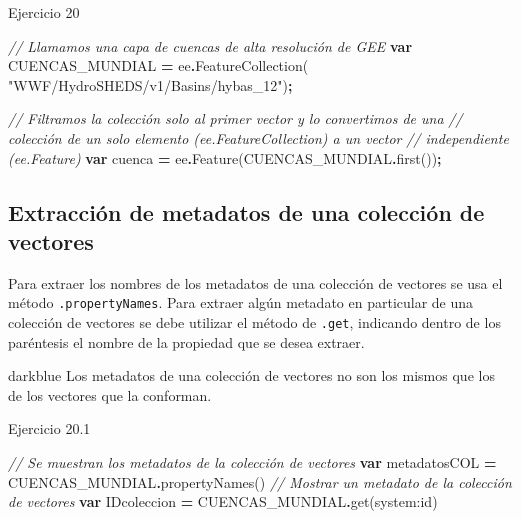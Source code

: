 \documentclass[
  12pt,
  letterpaper,
  twoside]{book}
\newenvironment{Shaded}{\begin{snugshade}}{\end{snugshade}}
\newcommand{\CommentTok}[1]{\textcolor[rgb]{0.56,0.35,0.01}{\textit{#1}}}
\newcommand{\FunctionTok}[1]{\textcolor[rgb]{0.00,0.00,0.00}{#1}}
\newcommand{\KeywordTok}[1]{\textcolor[rgb]{0.13,0.29,0.53}{\textbf{#1}}}
\newcommand{\NormalTok}[1]{#1}
\newcommand{\OperatorTok}[1]{\textcolor[rgb]{0.81,0.36,0.00}{\textbf{#1}}}
\newcommand{\StringTok}[1]{\textcolor[rgb]{0.31,0.60,0.02}{#1}}
\begin{document}
Ejercicio 20

\begin{Shaded}
\begin{Highlighting}[]
\CommentTok{// Llamamos una capa de cuencas de alta resolución de GEE}
\KeywordTok{var}\NormalTok{ CUENCAS\_MUNDIAL }\OperatorTok{=}\NormalTok{ ee}\OperatorTok{.}\FunctionTok{FeatureCollection}\NormalTok{(}
  \StringTok{"WWF/HydroSHEDS/v1/Basins/hybas\_12"}\NormalTok{)}\OperatorTok{;}
 
\CommentTok{// Filtramos la colección solo al primer vector y lo convertimos de una}
\CommentTok{// colección de un solo elemento (ee.FeatureCollection) a un vector }
\CommentTok{// independiente (ee.Feature)}
\KeywordTok{var}\NormalTok{ cuenca }\OperatorTok{=}\NormalTok{ ee}\OperatorTok{.}\FunctionTok{Feature}\NormalTok{(CUENCAS\_MUNDIAL}\OperatorTok{.}\FunctionTok{first}\NormalTok{())}\OperatorTok{;} 
\end{Highlighting}
\end{Shaded}

\hypertarget{extracciuxf3n-de-metadatos-de-una-colecciuxf3n-de-vectores}{%
\subsection{Extracción de metadatos de una colección de vectores}\label{extracciuxf3n-de-metadatos-de-una-colecciuxf3n-de-vectores}}

Para extraer los nombres de los metadatos de una colección de vectores se usa el método \texttt{.propertyNames}. Para extraer algún metadato en particular de una colección de vectores se debe utilizar el método de \texttt{.get}, indicando dentro de los paréntesis el nombre de la propiedad que se desea extraer.

\begin{bluebox2}

\begin{awesomeblock}{5pt}{\faLightbulb}{darkblue}
Los metadatos de una colección de vectores no son los mismos que los de los vectores que la conforman.

\end{awesomeblock}

\end{bluebox2}

Ejercicio 20.1

\begin{Shaded}
\begin{Highlighting}[]
\CommentTok{// Se muestran los metadatos de la  colección de vectores}
\KeywordTok{var}\NormalTok{ metadatosCOL }\OperatorTok{=}\NormalTok{ CUENCAS\_MUNDIAL}\OperatorTok{.}\FunctionTok{propertyNames}\NormalTok{()}
\CommentTok{// Mostrar un metadato de la colección de vectores}
\KeywordTok{var}\NormalTok{ IDcoleccion }\OperatorTok{=}\NormalTok{ CUENCAS\_MUNDIAL}\OperatorTok{.}\FunctionTok{get}\NormalTok{(}\StringTok{\textquotesingle{}system:id\textquotesingle{}}\NormalTok{) }
\end{Highlighting}
\end{Shaded}
\end{document}
